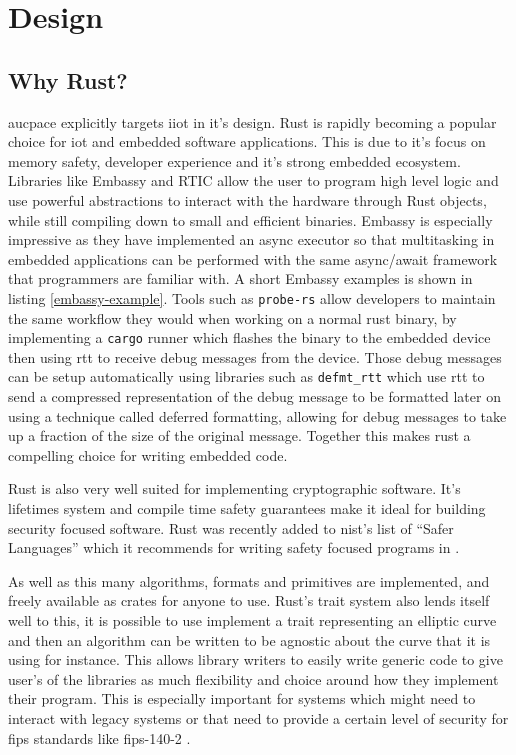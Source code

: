 \chapter{Design}
\label{chap:design}

\section{Why Rust?}
\label{sec:why-rust}

\gls{aucpace} explicitly targets \gls{iiot} in it's design.
Rust is rapidly becoming a popular choice for \gls{iot} and embedded software applications.
This is due to it's focus on memory safety, developer experience and it's strong embedded ecosystem.
Libraries like Embassy and RTIC allow the user to program high level logic and use powerful abstractions to interact with the hardware through Rust objects, while still compiling down to small and efficient binaries.
Embassy is especially impressive as they have implemented an async executor so that multitasking in embedded applications can be performed with the same async/await framework that programmers are familiar with.
A short Embassy examples is shown in listing \ref{embassy-example}.
Tools such as \texttt{probe-rs} allow developers to maintain the same workflow they would when working on a normal rust binary, by implementing a \texttt{cargo} runner which flashes the binary to the embedded device then using \gls{rtt} to receive debug messages from the device.
Those debug messages can be setup automatically using libraries such as \texttt{defmt\_rtt} which use \gls{rtt} to send a compressed representation of the debug message to be formatted later on using a technique called deferred formatting, allowing for debug messages to take up a fraction of the size of the original message.
Together this makes rust a compelling choice for writing embedded code.

\medskip{}


Rust is also very well suited for implementing cryptographic software.
It's lifetimes system and compile time safety guarantees make it ideal for building security focused software.
Rust was recently added to \gls{nist}'s list of \enquote{Safer Languages} which it recommends for writing safety focused programs in \cite{nist-safer-languages}.

As well as this many algorithms, formats and primitives are implemented, and freely available as crates for anyone to use.
Rust's trait system also lends itself well to this, it is possible to use implement a trait representing an elliptic curve and then an algorithm can be written to be agnostic about the curve that it is using for instance.
This allows library writers to easily write generic code to give user's of the libraries as much flexibility and choice around how they implement their program.
This is especially important for systems which might need to interact with legacy systems or that need to provide a certain level of security for \gls{fips} standards like \gls{fips}-140-2 \cite{fips-140-2}.

